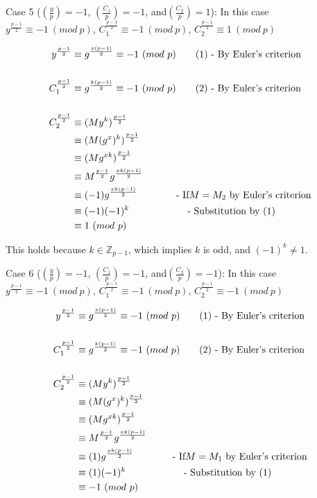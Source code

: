 \documentclass[11pt]{article}
\theoremstyle{definition}
\newcommand{\Z}{\mathbb{Z}}
\providecommand{\Leg}[2]{\genfrac{(}{)}{}{}{#1}{#2}}
\begin{document}
\begin{enumerate}
Case 5 ($\Leg{y}{p} = -1$, $\Leg{C_1}{p} = -1$, and$\Leg{C_2}{p} = 1$):
In this case $y^{\frac{p-1}{2}} \equiv -1\ (mod\ p)$, $C_1^{\frac{p-1}{2}} \equiv -1\ (mod\ p)$, $C_2^{\frac{p-1}{2}} \equiv 1\ (mod\ p)$

\begin{align*}
y^{\frac{p-1}{2}} &\equiv g^{\frac{x(p-1)}{2}} \equiv -1\ (mod\ p)			\text{\qquad(1) - By Euler’s criterion} \\
&\\
C_1^{\frac{p-1}{2}} &\equiv g^{\frac{k(p-1)}{2}} \equiv -1\ (mod\ p)			\text{\qquad(2) - By Euler’s criterion} \\
& \\
C_2^{\frac{p-1}{2}} &\equiv (My^k)^{\frac{p-1}{2}} \\
&\equiv (M(g^x)^k)^{\frac{p-1}{2}} \\
&\equiv (Mg^{xk})^{\frac{p-1}{2}} \\
&\equiv M^{\frac{p-1}{2}}g^{\frac{xk(p-1)}{2}} \\
&\equiv (-1)g^{\frac{xk(p-1)}{2}}								\text{\qquad\qquad- If$M = M_2$ by Euler’s criterion} \\
&\equiv (-1)(-1)^k											\text{\qquad\qquad\qquad- Substitution by (1)} \\
&\equiv 1\ (mod\ p)
\end{align*}

This holds because $k \in \Z_{p-1}$, which implies $k$ is odd, and $(-1)^k \ne 1$. 

Case 6 ($\Leg{y}{p} = -1$, $\Leg{C_1}{p} = -1$, and$\Leg{C_2}{p} = -1$):
In this case $y^{\frac{p-1}{2}} \equiv -1\ (mod\ p)$, $C_1^{\frac{p-1}{2}} \equiv -1\ (mod\ p)$, $C_2^{\frac{p-1}{2}} \equiv -1\ (mod\ p)$

\begin{align*}
y^{\frac{p-1}{2}} &\equiv g^{\frac{x(p-1)}{2}} \equiv -1\ (mod\ p)			\text{\qquad(1) - By Euler’s criterion} \\
&\\
C_1^{\frac{p-1}{2}} &\equiv g^{\frac{k(p-1)}{2}} \equiv -1\ (mod\ p)			\text{\qquad(2) - By Euler’s criterion} \\
& \\
C_2^{\frac{p-1}{2}} &\equiv (My^k)^{\frac{p-1}{2}} \\
&\equiv (M(g^x)^k)^{\frac{p-1}{2}} \\
&\equiv (Mg^{xk})^{\frac{p-1}{2}} \\
&\equiv M^{\frac{p-1}{2}}g^{\frac{xk(p-1)}{2}} \\
&\equiv (1)g^{\frac{xk(p-1)}{2}}								\text{\qquad\qquad- If$M = M_1$ by Euler’s criterion} \\
&\equiv (1)(-1)^k											\text{\qquad\qquad\qquad- Substitution by (1)} \\
&\equiv -1\ (mod\ p)
\end{align*}


\end{enumerate}
\end{document}
